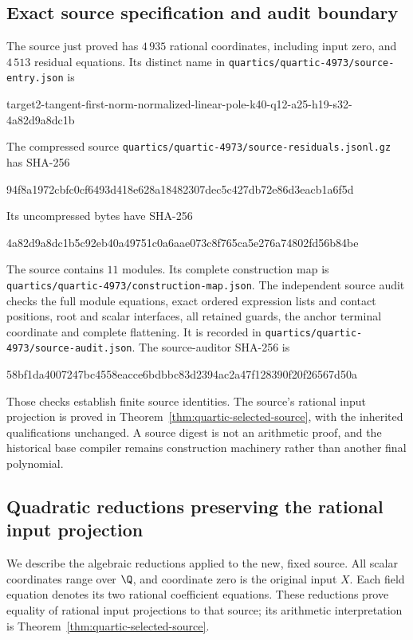 \subsection{Exact source specification and audit boundary}
The source just proved has $4\,935$ rational coordinates,
including input zero, and $4\,513$ residual equations.
Its distinct name in \nolinkurl{quartics/quartic-4973/source-entry.json} is
\begin{center}\footnotesize\ttfamily
target2-tangent-first-norm-normalized-linear-pole-k40-q12-a25-h19-s32-4a82d9a8dc1b
\end{center}
The compressed source \nolinkurl{quartics/quartic-4973/source-residuals.jsonl.gz} has SHA-256
\begin{center}\footnotesize\ttfamily
94f8a1972cbfc0cf6493d418e628a18482307dec5c427db72e86d3eacb1a6f5d
\end{center}
Its uncompressed bytes have SHA-256
\begin{center}\footnotesize\ttfamily
4a82d9a8dc1b5c92eb40a49751c0a6aae073c8f765ca5e276a74802fd56b84be
\end{center}
The source contains $11$ modules. Its complete construction map is \nolinkurl{quartics/quartic-4973/construction-map.json}.
The independent source audit checks the full module equations, exact
ordered expression lists and contact positions, root and scalar interfaces,
all retained guards, the anchor terminal coordinate and complete flattening.
It is recorded in \nolinkurl{quartics/quartic-4973/source-audit.json}. The source-auditor SHA-256 is
\begin{center}\footnotesize\ttfamily
58bf1da4007247bc4558eacce6bdbbc83d2394ac2a47f128390f20f26567d50a
\end{center}
Those checks establish finite source identities. The source's rational
input projection is proved in Theorem~\ref{thm:quartic-selected-source},
with the inherited qualifications unchanged. A source digest is not an
arithmetic proof, and the historical base compiler remains construction
machinery rather than another final polynomial.

\subsection{Quadratic reductions preserving the rational input projection}
\label{subsec:quartic-reductions}

We describe the algebraic reductions applied to the new, fixed source.
All scalar coordinates range over $\Q$, and coordinate zero is the original
input $X$. Each field equation denotes its two rational coefficient
equations. These reductions prove equality of rational input projections
to that source; its arithmetic interpretation is
Theorem~\ref{thm:quartic-selected-source}.


